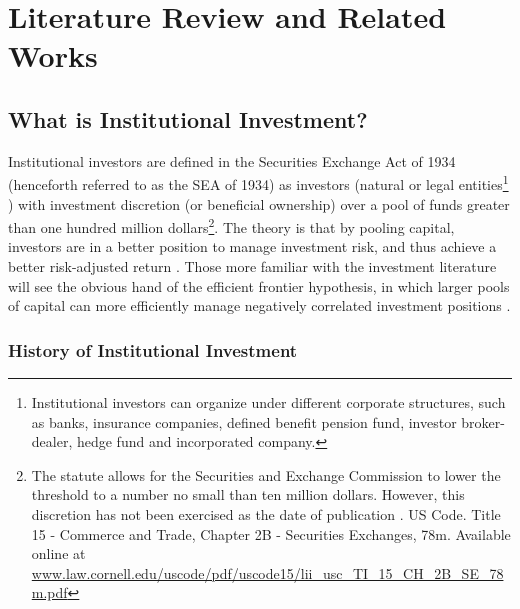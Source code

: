 \chapter{Literature Review and Related Works}
\label{ChapterII}
	
\section{What is Institutional Investment?}
	
Institutional investors are defined in the Securities Exchange Act of 1934 (henceforth referred to as the SEA of 1934) as investors (natural or legal entities\footnote{Institutional investors can organize under different corporate structures, such as banks, insurance companies, defined benefit pension fund, investor broker-dealer, hedge fund and incorporated company.} ) with investment discretion (or beneficial ownership) over a pool of funds greater than one hundred million dollars\footnote{The statute allows for the Securities and Exchange Commission to lower the threshold to a number no small than ten million dollars.  However, this discretion has not been exercised as the date of publication \citep{Davis2001}.  US Code. Title 15 - Commerce and Trade, Chapter 2B - Securities Exchanges, 78m. Available online at \url{www.law.cornell.edu/uscode/pdf/uscode15/lii_usc_TI_15_CH_2B_SE_78m.pdf}}.  The theory is that by pooling capital, investors are in a better position to manage investment risk, and thus achieve a better risk-adjusted return \citep{Davis2001}.  Those more familiar with the investment literature will see the obvious hand of the efficient frontier hypothesis, in which larger pools of capital can more efficiently manage negatively correlated investment positions \citep{Markowitz1952}.    
	
\subsection{History of Institutional Investment}

